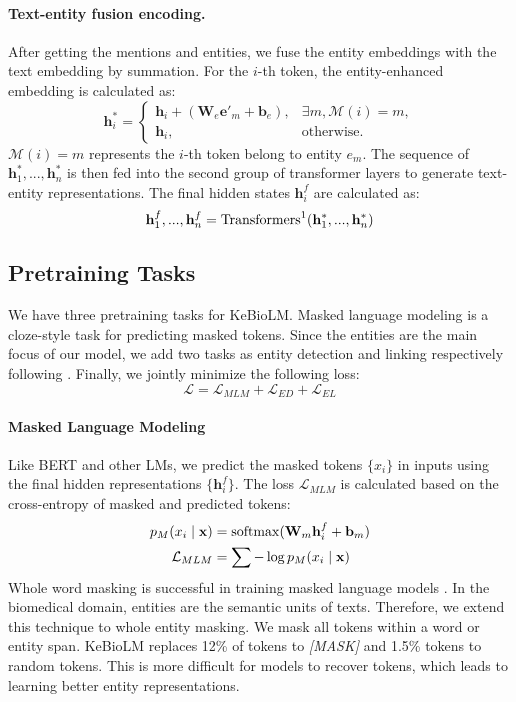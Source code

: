 \documentclass[11pt]{article}
\begin{document}
\paragraph{Text-entity fusion encoding.}
After getting the mentions
and entities,
we fuse the entity embeddings with the text embedding by summation.
For the $i$-th token,
the entity-enhanced embedding is calculated
as:
\begin{equation}
\mathbf{h}^*_i = 
\begin{cases}
     \mathbf{h}_i + \left(\mathbf{W}_e \mathbf{e}'_m + \mathbf{b}_e\right), & \exists m, \mathcal{M}(i) = m,  \\
     \mathbf{h}_i, & \textrm{otherwise.}
\end{cases}
\end{equation}
$\mathcal{M}(i) = m$ represents the $i$-th token belong to entity $e_m$.
The sequence of $\mathbf{h}^*_1, ..., \mathbf{h}^*_n$
is then fed into the second group of transformer layers
to generate text-entity representations.
The final hidden states $\mathbf{h}^f_i$ are calculated as:
\begin{equation}
    \mathbf{h}^f_1, ... , \mathbf{h}^f_n = {\rm Transformers}^{1}(\mathbf{h}^*_1, ..., \mathbf{h}^*_n)
\end{equation}




\subsection{Pretraining Tasks}
We have three pretraining tasks for KeBioLM.
Masked language modeling is a cloze-style task for predicting masked tokens.
Since the entities are the main focus of our model, we add two tasks as entity detection and linking respectively following \citet{fevry-etal-2020-entities}.
Finally, we jointly minimize the following loss:
\begin{equation}
    \mathcal{L} = \mathcal{L}_{MLM} + \mathcal{L}_{ED} + \mathcal{L}_{EL}
\end{equation}

\paragraph{Masked Language Modeling}
Like BERT and other LMs, we predict the masked tokens $\{x_i\}$ in inputs using the final hidden representations $\{\mathbf{h}^f_i\}$. The loss $\mathcal{L}_{MLM}$ is calculated based on the cross-entropy of masked and predicted tokens:
\begin{align}
    p_{M}(x_i \mid \mathbf{x}) &= {\rm softmax}(\mathbf{W}_m\mathbf{h}^f_i + \mathbf{b}_m) \\
    \mathcal{L}_{MLM} &= \sum-\log p_{M}(x_i \mid \mathbf{x})
\end{align}
Whole word masking is successful in training masked language models \cite{devlin-etal-2019-bert,cui2019pre}.
In the biomedical domain, entities are the semantic units of texts.
Therefore, we extend this technique to whole entity masking.
We mask all tokens within a word or entity span.
KeBioLM replaces 12\% of tokens to \textit{[MASK]} and 1.5\% tokens to random tokens.
This is more difficult for models to recover tokens, which leads to learning better entity representations.
\end{document}
